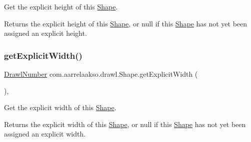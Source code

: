 Get the explicit height of this \hyperlink{classcom_1_1aarrelaakso_1_1drawl_1_1_shape}{Shape}. 

\begin{DoxyReturn}{Returns}
the explicit height of this \hyperlink{classcom_1_1aarrelaakso_1_1drawl_1_1_shape}{Shape}, or {\ttfamily null} if this \hyperlink{classcom_1_1aarrelaakso_1_1drawl_1_1_shape}{Shape} has not yet been assigned an explicit height. 
\end{DoxyReturn}
\mbox{\label{classcom_1_1aarrelaakso_1_1drawl_1_1_shape_aabb6ac3a04620e1c760bcea54797cba8}} 
\subsubsection{\texorpdfstring{get\+Explicit\+Width()}{getExplicitWidth()}}
{\footnotesize\ttfamily \hyperlink{classcom_1_1aarrelaakso_1_1drawl_1_1_drawl_number}{Drawl\+Number} com.\+aarrelaakso.\+drawl.\+Shape.\+get\+Explicit\+Width (\begin{DoxyParamCaption}{ }\end{DoxyParamCaption})\hspace{0.3cm}{\ttfamily [protected]}, {\ttfamily [inherited]}}



Get the explicit width of this \hyperlink{classcom_1_1aarrelaakso_1_1drawl_1_1_shape}{Shape}. 

\begin{DoxyReturn}{Returns}
the explicit width of this \hyperlink{classcom_1_1aarrelaakso_1_1drawl_1_1_shape}{Shape}, or {\ttfamily null} if this \hyperlink{classcom_1_1aarrelaakso_1_1drawl_1_1_shape}{Shape} has not yet been assigned an explicit width. 
\end{DoxyReturn}
\mbox{\label{classcom_1_1aarrelaakso_1_1drawl_1_1_shape_aaecae2f51794b77ff2f76b1be64b0d90}} 
